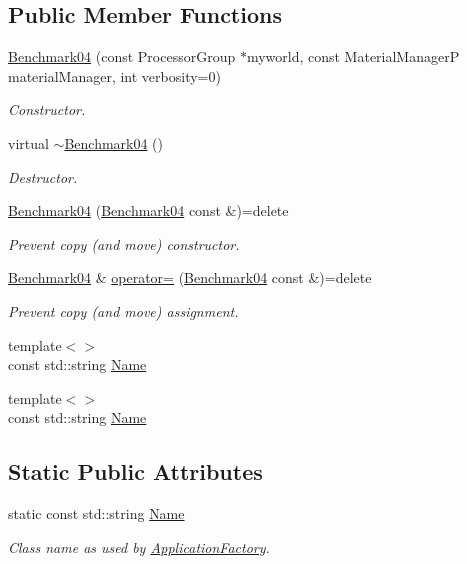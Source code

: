\subsection*{Public Member Functions}
\begin{DoxyCompactItemize}
\item 
\hyperlink{classUintah_1_1PhaseField_1_1Benchmark04_a2e812d73510d52d17943902bc85d4a34}{Benchmark04} (const Processor\+Group $\ast$myworld, const Material\+ManagerP material\+Manager, int verbosity=0)
\begin{DoxyCompactList}\small\item\em Constructor. \end{DoxyCompactList}\item 
virtual \hyperlink{classUintah_1_1PhaseField_1_1Benchmark04_ab612055f60d29494267419b89789f30f}{$\sim$\+Benchmark04} ()
\begin{DoxyCompactList}\small\item\em Destructor. \end{DoxyCompactList}\item 
\hyperlink{classUintah_1_1PhaseField_1_1Benchmark04_ae552c55e6fe5ccbc34e175902a9dc03e}{Benchmark04} (\hyperlink{classUintah_1_1PhaseField_1_1Benchmark04}{Benchmark04} const \&)=delete
\begin{DoxyCompactList}\small\item\em Prevent copy (and move) constructor. \end{DoxyCompactList}\item 
\hyperlink{classUintah_1_1PhaseField_1_1Benchmark04}{Benchmark04} \& \hyperlink{classUintah_1_1PhaseField_1_1Benchmark04_a4d5885a02b3a95cd6be86b8f8dead7f2}{operator=} (\hyperlink{classUintah_1_1PhaseField_1_1Benchmark04}{Benchmark04} const \&)=delete
\begin{DoxyCompactList}\small\item\em Prevent copy (and move) assignment. \end{DoxyCompactList}\item 
{\footnotesize template$<$$>$ }\\const std\+::string \hyperlink{classUintah_1_1PhaseField_1_1Benchmark04_a6cd972fc982ee6a408bc2f92336a9461}{Name}
\item 
{\footnotesize template$<$$>$ }\\const std\+::string \hyperlink{classUintah_1_1PhaseField_1_1Benchmark04_a72b1767a76b88213594a41883af9e431}{Name}
\end{DoxyCompactItemize}
\subsection*{Static Public Attributes}
\begin{DoxyCompactItemize}
\item 
static const std\+::string \hyperlink{classUintah_1_1PhaseField_1_1Benchmark04_a9ef3fef9b0df279c3922560e1c821985}{Name}
\begin{DoxyCompactList}\small\item\em Class name as used by \hyperlink{classUintah_1_1PhaseField_1_1ApplicationFactory}{Application\+Factory}. \end{DoxyCompactList}\end{DoxyCompactItemize}
